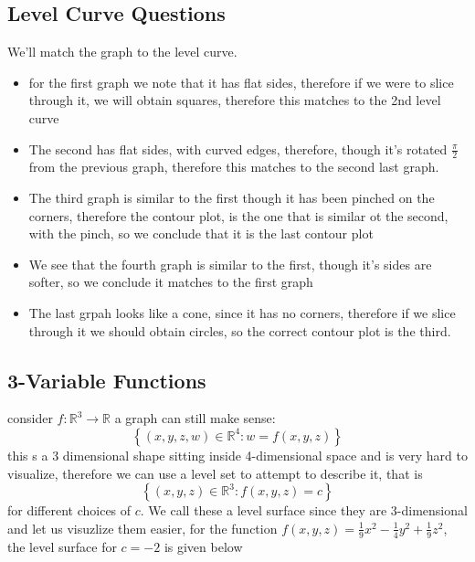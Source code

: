 \documentclass[11pt]{book}
\begin{document}
\subsection{Level Curve Questions}%
\label{sub:level_curve_questions}
We'll match the graph to the level curve.
\begin{itemize}
    \item for the first graph we note that it has flat sides, therefore if we were to slice through it, we will obtain squares, therefore this matches to the 2nd level curve
    \item The second has flat sides, with curved edges, therefore, though it's rotated $\frac{\pi}{2} $ from the previous graph, therefore this matches to the second last graph.
    \item The third graph is similar to the first though it has been pinched on the corners, therefore the contour plot, is the one that is similar ot the second, with the pinch, so we conclude that it is the last contour plot
    \item We see that the fourth graph is similar to the first, though it's sides are softer, so we conclude it matches to the first graph
    \item The last grpah looks like a cone, since it has no corners, therefore if we slice through it we should obtain circles, so the correct contour plot is the third.
\end{itemize}


\subsection{3-Variable Functions}%
\label{sub:3_variable_functions}

consider $f : \mathbb{R} ^{3}  \to \mathbb{R} $ a graph can still make sense: 
\[
    \left\{ \left( x,y,z,w \right) \in \mathbb{R} ^{4} : w= f\left(x,y,z\right)  \right\} 
\]
this s a 3 dimensional shape sitting inside 4-dimensional space and is very hard to visualize, therefore we can use a level set to attempt to describe it, that is 
\[
    \left\{ \left( x,y,z \right) \in  \mathbb{R}^{3} : f\left( x,y,z \right) = c \right\} 
\]
for different choices of $c$. We call these a level surface since they are 3-dimensional and let us visuzlize them easier, for the function $f\left(x,y,z\right) = \frac{1}{9}x^2  - \frac{1}{4}y^2  + \frac{1}{9}z^2 $,  the level surface for $c= -2$ is given below
\end{document}
